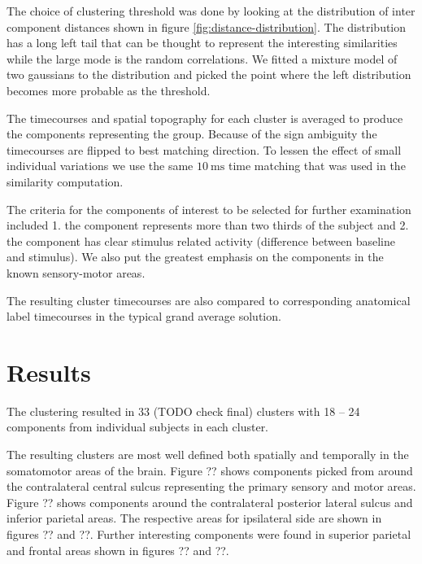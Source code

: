 \documentclass[]{article}
\begin{document}
The choice of clustering threshold was done by looking at the distribution of inter component distances shown in figure \ref{fig:distance-distribution}. The distribution has a long left tail that can be thought to represent the interesting similarities while the large mode is the random correlations. We fitted a mixture model of two gaussians to the distribution and picked the point where the left distribution becomes more probable as the threshold.


The timecourses and spatial topography for each cluster is averaged to produce the components representing the group. Because of the sign ambiguity the timecourses are flipped to best matching direction. To lessen the effect of small individual variations we use the same $\SI{10}{\milli\second}$ time matching that was used in the similarity computation. 

The criteria for the components of interest to be selected for further examination included 1. the component represents more than two thirds of the subject and 2. the component has clear stimulus related activity (difference between baseline and stimulus). We also put the greatest emphasis on the components in the known sensory-motor areas.

The resulting cluster timecourses are also compared to corresponding anatomical label timecourses in the typical grand average solution.


\section*{Results}

The clustering resulted in 33 (TODO check final) clusters with 18 -- 24 components from individual subjects in each cluster. 

The resulting clusters are most well defined both spatially and temporally in the somatomotor areas of the brain. Figure ?? shows components picked from around the contralateral central sulcus representing the primary sensory and motor areas. Figure ?? shows components around the contralateral posterior lateral sulcus and inferior parietal areas. The respective areas for ipsilateral side are shown in figures ?? and ??. Further interesting components were found in superior parietal and frontal areas shown in figures ?? and ??.

\end{document}
